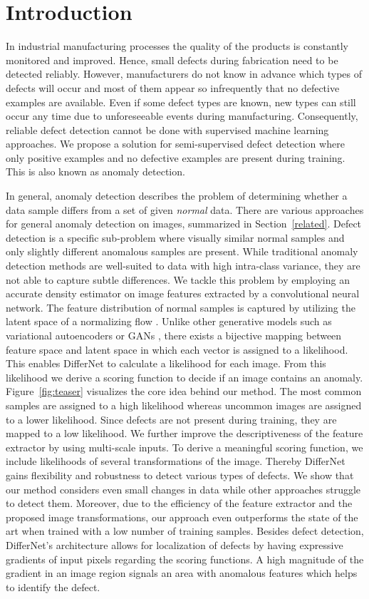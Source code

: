 \documentclass[10pt,twocolumn,letterpaper]{article}
\begin{document}
\section{Introduction}
In industrial manufacturing processes the quality of the products is constantly monitored and improved.
Hence, small defects during fabrication need to be detected reliably.
However, manufacturers do not know in advance which types of defects will occur and most of them appear so infrequently that no defective examples are available.
Even if some defect types are known, new types can still occur any time due to unforeseeable events during manufacturing.
Consequently, reliable defect detection cannot be done with supervised machine learning approaches.
We propose a solution for semi-supervised defect detection where only positive examples and no defective examples are present during training.
This is also known as anomaly detection.

In general, anomaly detection describes the problem of determining whether a data sample differs from a set of given \textit{normal} data.
There are various approaches for general anomaly detection on images, summarized in Section~\ref{related}.
Defect detection is a specific sub-problem where visually similar normal samples and only slightly different anomalous samples are present.
While traditional anomaly detection methods are well-suited to data with high intra-class variance, they are not able to capture subtle differences.
We tackle this problem by employing an accurate density estimator on image features extracted by a convolutional neural network.
The feature distribution of normal samples is captured by utilizing the latent space of a normalizing flow \cite{nf}.
Unlike other generative models such as variational autoencoders \cite{vae} or GANs \cite{gan}, there exists a bijective mapping between feature space and latent space in which each vector is assigned to a likelihood.
This enables DifferNet to calculate a likelihood for each image.
From this likelihood we derive a scoring function to decide if an image contains an anomaly.
Figure~\ref{fig:teaser} visualizes the core idea behind our method.
The most common samples are assigned to a high likelihood whereas uncommon images are assigned to a lower likelihood.
Since defects are not present during training, they are mapped to a low likelihood.
We further improve the descriptiveness of the feature extractor by using multi-scale inputs.
To derive a meaningful scoring function, we include likelihoods of several transformations of the image.
Thereby DifferNet gains flexibility and robustness to detect various types of defects.
We show that our method considers even small changes in data while other approaches struggle to detect them.
Moreover, due to the efficiency of the feature extractor and the proposed image transformations, our approach even outperforms the state of the art when trained with a low number of training samples.
Besides defect detection, DifferNet's architecture allows for localization of defects by having expressive gradients of input pixels regarding the scoring functions.
A high magnitude of the gradient in an image region signals an area with anomalous features which helps to identify the defect.
\end{document}
